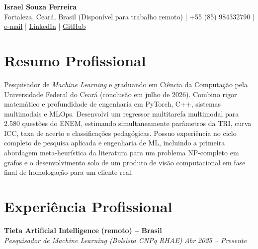 \documentclass[a4paper,10pt]{article}
\newcommand{\entrada}[4]{%
    \noindent\textbf{#1} \hfill \textbf{#2}\\
    \textit{#3} \hfill \textit{#4}\par
}
\begin{document}
\begin{center}
    {\LARGE \textbf{Israel Souza Ferreira}} \\[3pt]

    {\small
    Fortaleza, Ceará, Brasil (Disponível para trabalho remoto)
    \; | \;
    +55 (85) 984332790
    \; | \;
    \href{mailto:israel.souza.dev@gmail.com}{e-mail}
    \; | \;
    \href{https://www.linkedin.com/in/isrreal/}{LinkedIn}
    \; | \;
    \href{https://github.com/isrreal}{GitHub}
    }
\end{center}

\section*{Resumo Profissional}

Pesquisador de \textit{Machine Learning} e graduando em Ciência da Computação
pela Universidade Federal do Ceará (conclusão em julho de 2026). Combino
rigor matemático e profundidade de engenharia em PyTorch, C++, sistemas
multimodais e MLOps. Desenvolvi um regressor multitarefa multimodal para
2.580 questões do ENEM, estimando simultaneamente parâmetros da TRI, curva
ICC, taxa de acerto e classificações pedagógicas. Possuo experiência no ciclo
completo de pesquisa aplicada e engenharia de ML, incluindo a primeira
abordagem meta-heurística da literatura para um problema NP-completo em
grafos e o desenvolvimento solo de um produto de visão computacional em
fase final de homologação para um cliente real.

\section*{Experiência Profissional}

\entrada
    {Tieta Artificial Intelligence}
    {(remoto) -- Brasil}
    {Pesquisador de Machine Learning (Bolsista CNPq RHAE)}
    {Abr 2025 -- Presente}
\end{document}
